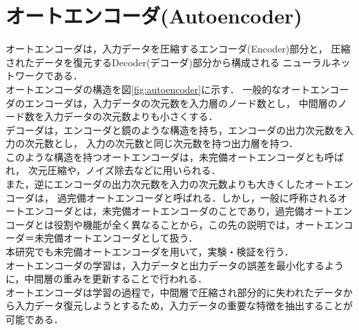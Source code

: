\section{オートエンコーダ(Autoencoder)}
オートエンコーダは，入力データを圧縮するエンコーダ(Encoder)部分と，
圧縮されたデータを復元するDecoder(デコーダ)部分から構成される
ニューラルネットワークである．\\
オートエンコーダの構造を図\ref{fig:autoencoder}に示す．
一般的なオートエンコーダのエンコーダは，入力データの次元数を入力層のノード数とし，
中間層のノード数を入力データの次元数よりも小さくする．\\
デコーダは，エンコーダと鏡のような構造を持ち，エンコーダの出力次元数を入力の次元数とし，
入力の次元数と同じ次元数を持つ出力層を持つ．\\
このような構造を持つオートエンコーダは，未完備オートエンコーダとも呼ばれ，
次元圧縮や，ノイズ除去などに用いられる．\\
また，逆にエンコーダの出力次元数を入力の次元数よりも大きくしたオートエンコーダは，
過完備オートエンコーダと呼ばれる．しかし，一般に呼称されるオートエンコーダとは，未完備オートエンコーダのことであり，過完備オートエンコーダとは役割や機能が全く異なることから，この先の説明では，オートエンコーダ＝未完備オートエンコーダとして扱う．\\
本研究でも未完備オートエンコーダを用いて，実験・検証を行う．\\

オートエンコーダの学習は，入力データと出力データの誤差を最小化するように，中間層の重みを更新することで行われる．\\

オートエンコーダは学習の過程で，中間層で圧縮され部分的に失われたデータから入力データ復元しようとするため，入力データの重要な特徴を抽出することが可能である．\\



\newpage